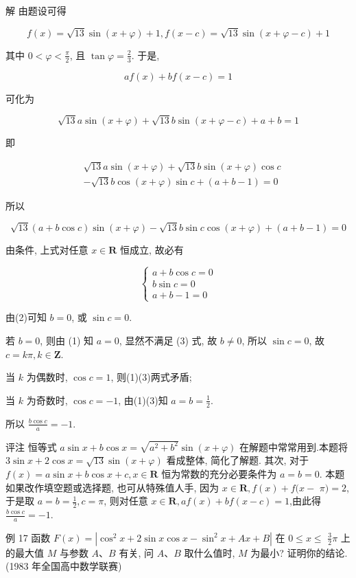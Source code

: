 	解 由题设可得

	$$
		f(x)=\sqrt{13} \sin (x+\varphi)+1, f(x-c)=\sqrt{13} \sin (x+\varphi-c)+1
	$$

	其中 $0<\varphi<\frac{\pi}{2}$, 且 $\tan \varphi=\frac{2}{3}$. 于是,

	$$
		a f(x)+b f(x-c)=1
	$$

	可化为

	$$
		\sqrt{13} a \sin (x+\varphi)+\sqrt{13} b \sin (x+\varphi-c)+a+b=1
	$$

	即

	$$
		\begin{aligned}
			 & \sqrt{13} a \sin (x+\varphi)+\sqrt{13} b \sin (x+\varphi) \cos c \\
			 & -\sqrt{13} b \cos (x+\varphi) \sin c+(a+b-1)=0
		\end{aligned}
	$$

	所以

	$$
		\sqrt{13}(a+b \cos c) \sin (x+\varphi)-\sqrt{13} b \sin c \cos (x+\varphi)+(a+b-1)=0
	$$

	由条件, 上式对任意 $x \in \mathbf{R}$ 恒成立, 故必有

	\[
		\left\{\begin{array}{l}
			a+b \cos c=0  \tag{1} \\
			b \sin c=0            \\
			a+b-1=0
		\end{array}\right.
	\]

	由(2)可知 $b=0$, 或 $\sin c=0$.

	若 $b=0$, 则由 (1) 知 $a=0$, 显然不满足 (3) 式, 故 $b \neq 0$, 所以 $\sin c=0$, 故 $c=k \pi, k \in \mathbf{Z}$.

	当 $k$ 为偶数时, $\cos c=1$, 则(1)(3)两式矛盾;

	当 $k$ 为奇数时, $\cos c=-1$, 由(1)(3)知 $a=b=\frac{1}{2}$.

	所以 $\frac{b \cos c}{a}=-1$.

	评注 恒等式 $a \sin x+b \cos x=\sqrt{a^{2}+b^{2}} \sin (x+\varphi)$ 在解题中常常用到.本题将 $3 \sin x+2 \cos x=\sqrt{13} \sin (x+\varphi)$ 看成整体, 简化了解题. 其次, 对于 $f(x)=a \sin x+b \cos x+c, x \in \mathbf{R}$ 恒为常数的充分必要条件为 $a=b=0$. 本题如果改作填空题或选择题, 也可从特殊值人手, 因为 $x \in \mathbf{R}, f(x)+f(x-$ $\pi)=2$, 于是取 $a=b=\frac{1}{2}, c=\pi$, 则对任意 $x \in \mathbf{R}, a f(x)+b f(x-c)=1$,由此得 $\frac{b \cos c}{a}=-1$.

	例 17 函数 $F(x)=\left|\cos ^{2} x+2 \sin x \cos x-\sin ^{2} x+A x+B\right|$ 在 $0 \leqslant x \leqslant$ $\frac{3}{2} \pi$ 上的最大值 $M$ 与参数 $A 、 B$ 有关, 问 $A 、 B$ 取什么值时, $M$ 为最小? 证明你的结论. (1983 年全国高中数学联赛)

